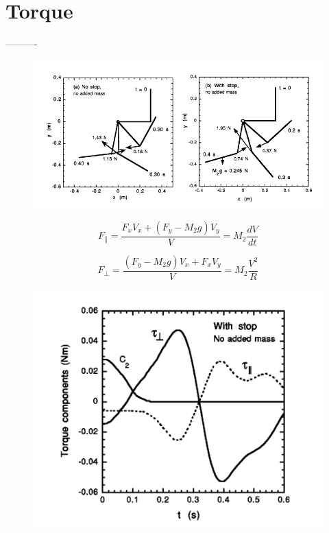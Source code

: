 \documentclass[%
 aip,
 amsmath,amssymb,
 reprint,%
 floatfix,%
]{revtex4-1}
\begin{document}
\section{\label{sec:level4}Torque}
----------
\begin{figure}
	\centering
	\includegraphics[scale=0.3]{torque.png}
	\caption{}
\end{figure}

\begin{equation}
	F_{\parallel}=\frac{F_x V_x + (F_y - M_2 g) V_y}{V} = M_2 \frac{dV}{dt}
\end{equation}

\begin{equation}
	F_{\perp}=\frac{(F_y - M_2 g)V_x+ F_x V_y}{V} = M_2 \frac{V^2}{R}
\end{equation}

\begin{figure}
	\centering
	\includegraphics[scale=0.4]{totaltorque.png}
	\caption{}
\end{figure}
		
\end{document}

